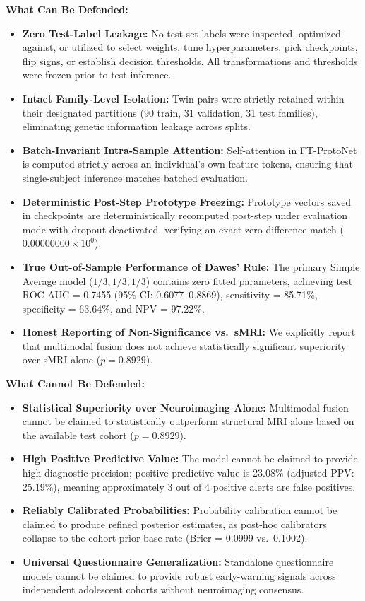 \documentclass[10pt,letterpaper]{article}
\begin{document}
\textbf{What Can Be Defended:}
\begin{itemize}
    \item \textbf{Zero Test-Label Leakage:} No test-set labels were inspected, optimized against, or utilized to select weights, tune hyperparameters, pick checkpoints, flip signs, or establish decision thresholds. All transformations and thresholds were frozen prior to test inference.
    \item \textbf{Intact Family-Level Isolation:} Twin pairs were strictly retained within their designated partitions (90 train, 31 validation, 31 test families), eliminating genetic information leakage across splits.
    \item \textbf{Batch-Invariant Intra-Sample Attention:} Self-attention in FT-ProtoNet is computed strictly across an individual's own feature tokens, ensuring that single-subject inference matches batched evaluation.
    \item \textbf{Deterministic Post-Step Prototype Freezing:} Prototype vectors saved in checkpoints are deterministically recomputed post-step under evaluation mode with dropout deactivated, verifying an exact zero-difference match ($0.00000000\times 10^0$).
    \item \textbf{True Out-of-Sample Performance of Dawes' Rule:} The primary Simple Average model ($1/3, 1/3, 1/3$) contains zero fitted parameters, achieving test ROC-AUC = 0.7455 (95\% CI: 0.6077--0.8869), sensitivity = 85.71\%, specificity = 63.64\%, and NPV = 97.22\%.
    \item \textbf{Honest Reporting of Non-Significance vs.\ sMRI:} We explicitly report that multimodal fusion does not achieve statistically significant superiority over sMRI alone ($p = 0.8929$).
\end{itemize}

\textbf{What Cannot Be Defended:}
\begin{itemize}
    \item \textbf{Statistical Superiority over Neuroimaging Alone:} Multimodal fusion cannot be claimed to statistically outperform structural MRI alone based on the available test cohort ($p = 0.8929$).
    \item \textbf{High Positive Predictive Value:} The model cannot be claimed to provide high diagnostic precision; positive predictive value is 23.08\% (adjusted PPV: 25.19\%), meaning approximately 3 out of 4 positive alerts are false positives.
    \item \textbf{Reliably Calibrated Probabilities:} Probability calibration cannot be claimed to produce refined posterior estimates, as post-hoc calibrators collapse to the cohort prior base rate (Brier = 0.0999 vs.\ 0.1002).
    \item \textbf{Universal Questionnaire Generalization:} Standalone questionnaire models cannot be claimed to provide robust early-warning signals across independent adolescent cohorts without neuroimaging consensus.
\end{itemize}
\end{document}
